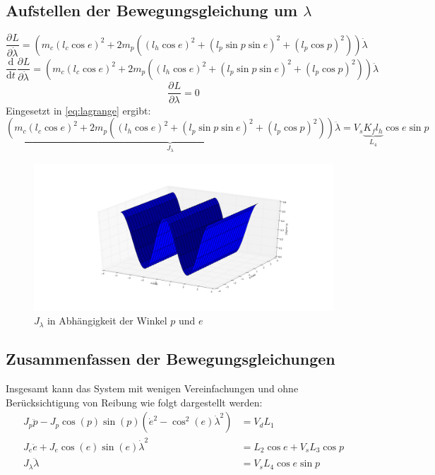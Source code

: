 \documentclass{article}
\newcommand{\partiell}[3][]{\frac{\partial^{#1}#2}{\partial{#3}^{#1}}}
\newcommand{\diff}[3][]{\frac{\mathrm{d}^{#1}#2}{\mathrm{d}{#3}^{#1}}}
\begin{document}
	\subsection{Aufstellen der Bewegungsgleichung um $\lambda$}
	\begin{equation}
	\partiell{L}{\dot{\lambda}} = (m_c (l_c \cos e)^2
	+ 2 m_p((l_h \cos e)^2 + (l_p \sin p \sin e)^2+(l_p \cos p)^2))\dot{\lambda}
	\end{equation}
	\begin{equation}
	\diff{}{t}\partiell{L}{\dot{\lambda}} = (m_c (l_c \cos e)^2
	+ 2 m_p((l_h \cos e)^2 + (l_p \sin p \sin e)^2+(l_p \cos p)^2))\ddot{\lambda}
	\end{equation}
	\begin{equation}
	\partiell{L}{\lambda} = 0
	\end{equation}
	Eingesetzt in \eqref{eq:lagrange} ergibt:
	\begin{equation}
	\underbrace{(m_c (l_c \cos e)^2
	+ 2 m_p((l_h \cos e)^2 + (l_p \sin p \sin e)^2+(l_p \cos p)^2))}_{J_\lambda}\ddot{\lambda} =  V_s \underbrace{K_f l_h}_{L_4} \cos e \sin p
	\end{equation}
	\begin{figure}[ht]
		\centering
		\includegraphics[width=1\textwidth]{images/J_l}
		\caption{$J_\lambda$ in Abhängigkeit der Winkel $p$ und $e$}
		\label{fig:J_l}
	\end{figure}	
	\subsection{Zusammenfassen der Bewegungsgleichungen}
	Insgesamt kann das System mit wenigen Vereinfachungen und ohne Berücksichtigung von Reibung wie folgt dargestellt werden:
	\begin{align}
	J_p \ddot{p} - J_p \cos (p) \sin (p) (\dot{e}^2- \cos^2 (e) \dot{\lambda}^2) &= V_d L_1\\
	J_e\ddot{e} + J_e \cos (e) \sin (e) \dot{\lambda}^2 
	&= L_2 \cos e + V_s L_3 \cos p\\
	J_\lambda \ddot{\lambda} &= V_s L_4 \cos e \sin p
	\end{align}
\end{document}
